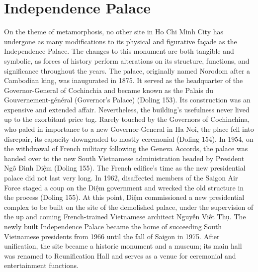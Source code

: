\section{Independence Palace}
\vi

On the theme of metamorphosis, no other site in Ho Chi Minh City has undergone as many modifications to its physical and figurative façade as the Independence Palace. The changes to this monument are both tangible and symbolic, as forces of history perform alterations on its structure, functions, and significance throughout the years. The palace, originally named Norodom after a Cambodian king, was inaugurated in 1875. It served as the headquarter of the Governor-General of Cochinchia and became known as the Palais du Gouvernement-général (Governor’s Palace) (Doling 153). Its construction was an expensive and extended affair. Nevertheless, the building’s usefulness never lived up to the exorbitant price tag. Rarely touched by the Governors of Cochinchina, who paled in importance to a new Governor-General in Ha Noi, the place fell into disrepair, its capacity downgraded to mostly ceremonial (Doling 154). In 1954, on the withdrawal of French military following the Geneva Accords, the palace was handed over to the new South Vietnamese administration headed by President Ngô Đình Diệm (Doling 155). The French edifice’s time as the new presidential palace did not last very long. In 1962, disaffected members of the Saigon Air Force staged a coup on the Diệm government and wrecked the old structure in the process (Doling 155). At this point, Diệm commissioned a new presidential complex to be built on the site of the demolished palace, under the supervision of the up and coming French-trained Vietnamese architect Nguyễn Viết Thụ. The newly built Independence Palace became the home of succeeding South Vietnamese presidents from 1966 until the fall of Saigon in 1975. After unification, the site became a historic monument and a museum; its main hall was renamed to Reunification Hall and serves as a venue for ceremonial and entertainment functions.

